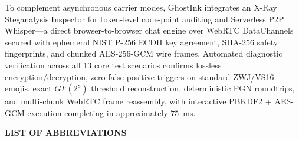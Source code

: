 \documentclass[12pt,a4paper,oneside,openany]{report}
\begin{document}
\hspace*{0.5in}To complement asynchronous carrier modes, GhostInk integrates an X-Ray Steganalysis Inspector for token-level code-point auditing and Serverless P2P Whisper---a direct browser-to-browser chat engine over WebRTC DataChannels secured with ephemeral NIST P-256 ECDH key agreement, SHA-256 safety fingerprints, and chunked AES-256-GCM wire frames. Automated diagnostic verification across all 13 core test scenarios confirms lossless encryption/decryption, zero false-positive triggers on standard ZWJ/VS16 emojis, exact $GF(2^8)$ threshold reconstruction, deterministic PGN roundtrips, and multi-chunk WebRTC frame reassembly, with interactive PBKDF2 + AES-GCM execution completing in approximately $75$~ms.

\clearpage
\tableofcontents

\clearpage
\listoffigures
{}

\clearpage
\listoftables
{}

\clearpage
\thispagestyle{plain}
\begin{center}
    {\Large \textbf{LIST OF ABBREVIATIONS}}\\[0.5cm]
\end{center}
\end{document}
